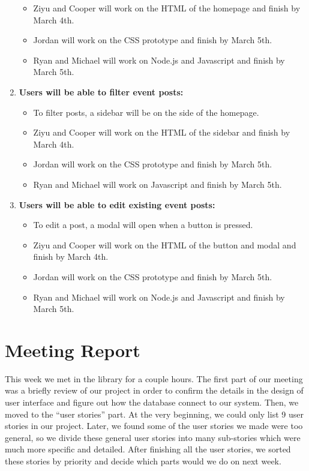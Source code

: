 \documentclass[a4paper]{article}
\begin{document}
\begin{enumerate}
\begin{itemize}
\item Ziyu and Cooper will work on the HTML of the homepage and finish by March 4th.
\item Jordan will work on the CSS prototype and finish by March 5th.
\item Ryan and Michael will work on Node.js and Javascript and finish by March 5th.
\end{itemize}
\item \textbf{Users will be able to filter event posts:}
\begin{itemize}
\item To filter posts, a sidebar will be on the side of the homepage.
\item Ziyu and Cooper will work on the HTML of the sidebar and finish by March 4th.
\item Jordan will work on the CSS prototype and finish by March 5th.
\item Ryan and Michael will work on Javascript and finish by March 5th.
\end{itemize}
\item \textbf{Users will be able to edit existing event posts:}
\begin{itemize}
\item To edit a post, a modal will open when a button is pressed.
\item Ziyu and Cooper will work on the HTML of the button and modal and finish by March 4th.
\item Jordan will work on the CSS prototype and finish by March 5th.
\item Ryan and Michael will work on Node.js and Javascript and finish by March 5th.
\end{itemize}
\end{enumerate}
\newpage

\section{Meeting Report}
This week we met in the library for a couple hours. The first part of our meeting was a briefly review of our project in order to confirm the details in the design of user interface and figure out how the database connect to our system. 
Then, we moved to the “user stories” part. At the very beginning, we could only list 9 user stories in our project. Later, we found some of the user stories we made were too general, so we divide these general user stories into many sub-stories which were much more specific and detailed. After finishing all the user stories, we sorted these stories by priority and decide which parts would we do on next week. 
\end{document}
